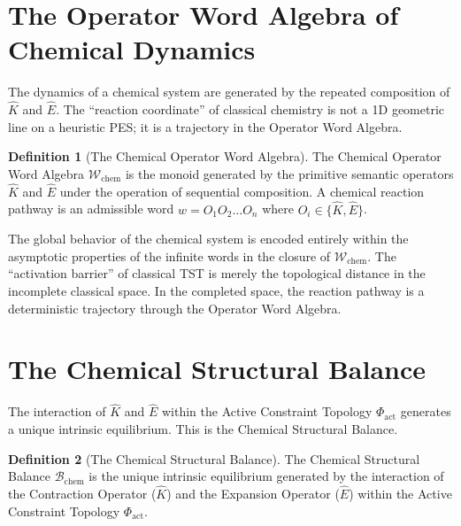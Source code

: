 \documentclass[11pt,openany]{extbook}
\theoremstyle{plain}
\theoremstyle{definition}
\newtheorem{definition}{Definition}[chapter]
\begin{document}
\section{The Operator Word Algebra of Chemical Dynamics}

The dynamics of a chemical system are generated by the repeated composition of $\hat{K}$ and $\hat{E}$. The ``reaction coordinate'' of classical chemistry is not a 1D geometric line on a heuristic PES; it is a trajectory in the Operator Word Algebra.

\begin{definition}[The Chemical Operator Word Algebra]
The Chemical Operator Word Algebra $\mathcal{W}_{\text{chem}}$ is the monoid generated by the primitive semantic operators $\hat{K}$ and $\hat{E}$ under the operation of sequential composition. A chemical reaction pathway is an admissible word $w = O_1 O_2 \dots O_n$ where $O_i \in \{\hat{K}, \hat{E}\}$.
\end{definition}

The global behavior of the chemical system is encoded entirely within the asymptotic properties of the infinite words in the closure of $\mathcal{W}_{\text{chem}}$. The ``activation barrier'' of classical TST is merely the topological distance in the incomplete classical space. In the completed space, the reaction pathway is a deterministic trajectory through the Operator Word Algebra.

\section{The Chemical Structural Balance}

The interaction of $\hat{K}$ and $\hat{E}$ within the Active Constraint Topology $\Phi_{\text{act}}$ generates a unique intrinsic equilibrium. This is the Chemical Structural Balance.

\begin{definition}[The Chemical Structural Balance]
The Chemical Structural Balance $\mathcal{B}_{\text{chem}}$ is the unique intrinsic equilibrium generated by the interaction of the Contraction Operator ($\hat{K}$) and the Expansion Operator ($\hat{E}$) within the Active Constraint Topology $\Phi_{\text{act}}$.
\end{definition}
\end{document}
